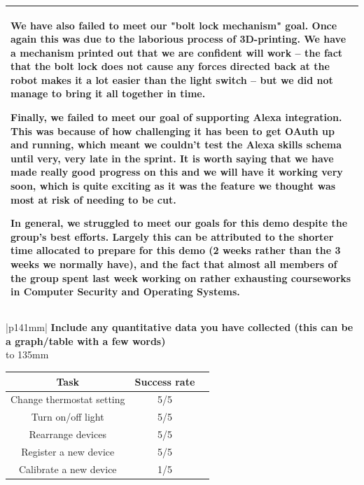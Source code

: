 \documentclass[a4paper]{article}
\newcommand{\colWidth}{141mm}
\begin{document}
\begin{center}
\begin{tabular}{|p{\colWidth}|}
{		\vspace{3mm}
		
		We have also failed to meet our "bolt lock mechanism" goal. Once again this was due to the
		laborious process of 3D-printing. We have a mechanism printed out that we are confident will work
		-- the fact that the bolt lock does not cause any forces directed back at the robot makes it a lot
		easier than the light switch -- but we did not manage to bring it all together in time.

		\vspace{3mm}

		Finally, we failed to meet our goal of supporting Alexa integration. This was because of how challenging
		it has been to get OAuth up and running, which meant we couldn't test the Alexa skills schema until very,
		very late in the sprint. It is worth saying that we have made really good progress on this and 
		we will have it working very soon, which is quite exciting as it was the feature we thought was most at
		risk of needing to be cut.
		
		\vspace{3mm}
		
		In general, we struggled to meet our goals for this demo despite the group's best efforts.
		Largely this can be attributed to the shorter time allocated to prepare for this demo (2 weeks rather than the 3 weeks we normally have), and the fact that almost all members of the group spent last week working on rather exhausting
		courseworks in Computer Security and Operating Systems.
		
  }
  \\
  \hline
\end{tabular}
\vskip 5mm


\begin{tabular}{|p{\colWidth}|}
	\hline
	\large
	\textbf{Include any quantitative data you have collected (this can be a graph/table with a few words)}
	\\ \hline
	\vtop to 135mm{
		\begin{tabular}{| c || c | c} \hline
			\textbf{Task} & \textbf{Success rate}\\ \hline
			Change thermostat setting & 5/5 \\
			Turn on/off light & 5/5\\
			Rearrange devices & 5/5\\
			Register a new device & 5/5 \\
			Calibrate a new device & 1/5 \\ \hline
		\end{tabular}

}
\end{tabular}
\end{center}
\end{document}
